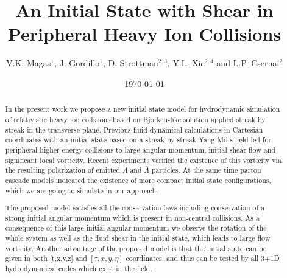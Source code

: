 \documentclass[aps,prc,twocolumn,floatfix,showpacs,a4paper,
nofootinbib,amsmath,amssymb]{revtex4-1}
\begin{document}
\title{An Initial State with Shear in Peripheral Heavy Ion Collisions}

\author{V.K. Magas$^1$, J. Gordillo$^1$, D. Strottman$^{2,3}$, 
Y.L. Xie$^{2,4}$ and L.P. Csernai$^2$}
\smallskip



\begin{abstract}
In the present work we propose a new initial state model for hydrodynamic simulation of relativistic heavy ion collisions based on Bjorken-like solution applied streak by streak in the transverse plane. 
Previous fluid dynamical calculations in Cartesian coordinates with an initial state based on a streak by streak Yang-Mills field led for peripheral higher energy collisions  to large angular momentum, initial shear flow and significant local vorticity. Recent experiments verified the existence of this vorticity via the resulting polarization of emitted $\Lambda$ and $\bar{\Lambda}$ particles. At the same time parton cascade models indicated the existence of more compact initial state configurations, which we are going to simulate in our approach. 

The proposed model satisfies all the conservation laws including  conservation of a strong initial angular momentum which is present in non-central collisions. As a consequence of this large initial angular momentum we observe the rotation of the whole system as well as the fluid shear in the initial state, which leads to large flow vorticity. Another advantage of the proposed model is that the initial state can be given in both [t,x,y,z] and $[\tau, x, y, \eta]$ coordinates, and thus can be tested by all 3+1D hydrodynamical codes which exist in the field. 

\end{abstract}
\date{\today}



\maketitle
\end{document}
